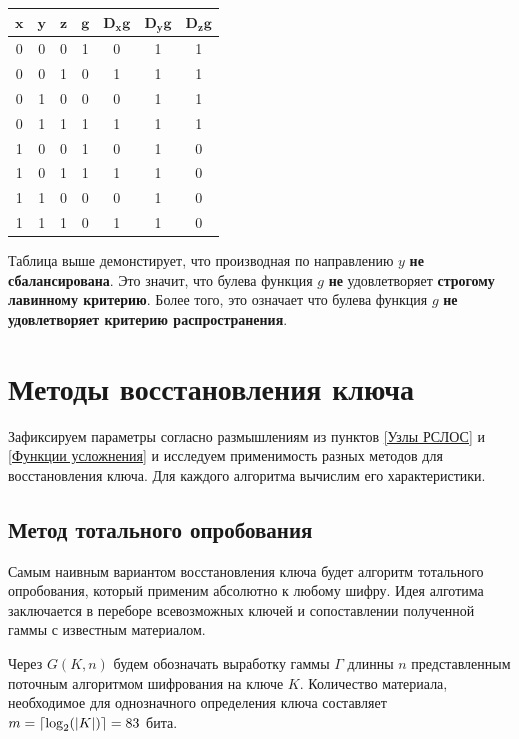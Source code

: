 \documentclass[a4paper,12pt]{article}
\DeclarePairedDelimiter{\ceil}{\lceil}{\rceil}
\theoremstyle{definition}
\begin{document}
	
	\begin{table}[h!]
		\begin{center}
			\begin{tabular}{|c|c|c||c||c|c|c|}
				\hline
				$ \pmb{x} $ & $ \pmb{y} $ & $ \pmb{z} $ & $ \pmb{g} $ & $ \pmb{D_x g} $ & $ \pmb{D_y g} $ & $ \pmb{D_z g} $ \\ \hline
				0 & 0 & 0 & 1 & 0 & 1 & 1 \\ \hline
				0 & 0 & 1 & 0 & 1 & 1 & 1 \\ \hline
				0 & 1 & 0 & 0 & 0 & 1 & 1 \\ \hline
				0 & 1 & 1 & 1 & 1 & 1 & 1 \\ \hline
				1 & 0 & 0 & 1 & 0 & 1 & 0 \\ \hline
				1 & 0 & 1 & 1 & 1 & 1 & 0 \\ \hline
				1 & 1 & 0 & 0 & 0 & 1 & 0 \\ \hline
				1 & 1 & 1 & 0 & 1 & 1 & 0 \\ \hline
			\end{tabular}
		\end{center}
	\end{table}
	
	
	Таблица выше демонстирует, что производная по направлению $y$ \textbf{не сбалансирована}. Это значит, что булева функция $g$ \textbf{не} удовлетворяет \textbf{строгому лавинному критерию}. Более того, это означает что булева функция $g$ \textbf{не удовлетворяет критерию распространения}.
	
	\section{Методы восстановления ключа}
	
	Зафиксируем параметры согласно размышлениям из пунктов \ref{Узлы РСЛОС} и \ref{Функции усложнения} и исследуем применимость разных методов для восстановления ключа. Для каждого алгоритма вычислим его характеристики.
	
	
	\subsection{Метод тотального опробования}
	
	Самым наивным вариантом восстановления ключа будет алгоритм тотального опробования, который применим абсолютно к любому шифру. Идея алготима заключается в переборе всевозможных ключей и сопоставлении полученной гаммы с известным материалом.
	
	Через $G(K, n)$ будем обозначать выработку гаммы $\Gamma$ длинны $n$ представленным поточным алгоритмом шифрования на ключе $K$. Количество материала, необходимое для однозначного определения ключа составляет $m=\ceil{\log_2(|K|)}=83$ бита.
\end{document}

